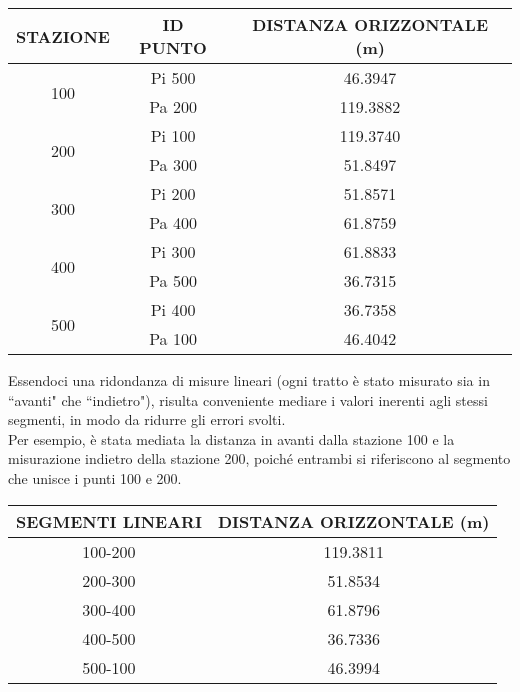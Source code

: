 \begin{table}[H] \centering
\begin{tabular}{ccc}
\toprule
STAZIONE             & ID PUNTO & DISTANZA ORIZZONTALE (m) \\
\midrule
\multirow{2}{*}{100} & Pi 500   & 46.3947                  \\
                     & Pa 200   & 119.3882                 \\
\midrule
\multirow{2}{*}{200} & Pi 100   & 119.3740                 \\
                     & Pa 300   & 51.8497                  \\
\midrule
\multirow{2}{*}{300} & Pi 200   & 51.8571                  \\
                     & Pa 400   & 61.8759                  \\
\midrule
\multirow{2}{*}{400} & Pi 300   & 61.8833                  \\
                     & Pa 500   & 36.7315                  \\
\midrule
\multirow{2}{*}{500} & Pi 400   & 36.7358                  \\
                     & Pa 100   & 46.4042                  \\
\bottomrule
\end{tabular}
\end{table}
Essendoci una ridondanza di misure lineari (ogni tratto è stato misurato sia in ``avanti" che ``indietro"), risulta conveniente mediare i valori inerenti agli stessi segmenti, in modo da ridurre gli errori svolti.\\
Per esempio, è stata mediata la distanza in avanti dalla stazione 100 e la misurazione indietro della stazione 200, poiché entrambi si riferiscono al segmento che unisce i punti 100 e 200.\\
\begin{table}[H] \centering
\begin{tabular}{cc}
\toprule
SEGMENTI LINEARI & DISTANZA ORIZZONTALE (m) \\
\midrule
100-200          & 119.3811                 \\
200-300          & 51.8534                  \\
300-400          & 61.8796                  \\
400-500          & 36.7336                  \\
500-100          & 46.3994                  \\
\bottomrule
\end{tabular}
\end{table}

